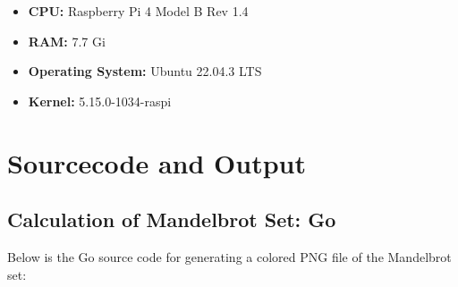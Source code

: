 \begin{itemize}
    \item \textbf{CPU:} Raspberry Pi 4 Model B Rev 1.4
    \item \textbf{RAM:} 7.7 Gi
    \item \textbf{Operating System:} Ubuntu 22.04.3 LTS
    \item \textbf{Kernel:} 5.15.0-1034-raspi
\end{itemize}

\section{Sourcecode and Output}

\subsection{Calculation of Mandelbrot Set: Go}
\label{app:code:mandelbrot1}
Below is the Go source code for generating a colored PNG file of the Mandelbrot set:

